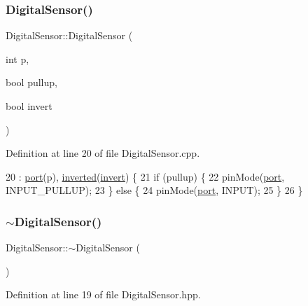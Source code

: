 \subsubsection{\texorpdfstring{Digital\+Sensor()}{DigitalSensor()}\hspace{0.1cm}{\footnotesize\ttfamily [2/2]}}
{\footnotesize\ttfamily Digital\+Sensor\+::\+Digital\+Sensor (\begin{DoxyParamCaption}\item[{int}]{p,  }\item[{bool}]{pullup,  }\item[{bool}]{invert }\end{DoxyParamCaption})}



Definition at line 20 of file Digital\+Sensor.\+cpp.


\begin{DoxyCode}
20                                                             : \hyperlink{class_digital_sensor_a5d6d5b9d33670b7f2d8b745b175ce023}{port}(p), 
      \hyperlink{class_digital_sensor_a0458d9c3e2f781a776742a080d7b7e81}{inverted}(\hyperlink{class_digital_sensor_a1e6784022a127dd543bbfcc4f69c4802}{invert}) \{
21     \textcolor{keywordflow}{if} (pullup) \{
22         pinMode(\hyperlink{class_digital_sensor_a5d6d5b9d33670b7f2d8b745b175ce023}{port}, INPUT\_PULLUP);
23     \} \textcolor{keywordflow}{else} \{
24         pinMode(\hyperlink{class_digital_sensor_a5d6d5b9d33670b7f2d8b745b175ce023}{port}, INPUT);
25     \}
26 \}
\end{DoxyCode}
\mbox{\label{class_digital_sensor_ab74d9e7e77b4ea505cd42a364017ded0}} 
\subsubsection{\texorpdfstring{$\sim$\+Digital\+Sensor()}{~DigitalSensor()}}
{\footnotesize\ttfamily Digital\+Sensor\+::$\sim$\+Digital\+Sensor (\begin{DoxyParamCaption}{ }\end{DoxyParamCaption})\hspace{0.3cm}{\ttfamily [inline]}}



Definition at line 19 of file Digital\+Sensor.\+hpp.


